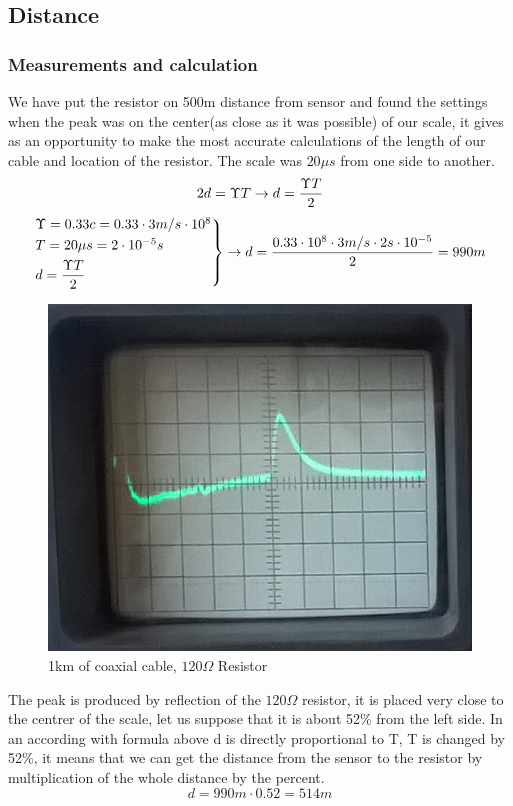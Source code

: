 \documentclass[english]{article}
\begin{document}
\subsection{Distance}
\subsubsection{Measurements and calculation}
We have put the resistor on 500m distance from sensor and found the settings when the peak was on the center(as close as it was possible) of our scale, it gives as an opportunity to make the most accurate calculations of the length of our cable and location of the resistor. The scale was $20\mu s$ from one side to another.
$$
2d= \Upsilon T \rightarrow d=\dfrac{\Upsilon T}{2}\\
$$
$$
\begin{rcases}
\Upsilon=0.33c=0.33 \cdot 3m/s \cdot 10^8 \\
T=20 \mu s=2 \cdot10^{-5}s\\
d=\dfrac{\Upsilon T}{2}
\end{rcases}  \rightarrow d=\frac{0.33 \cdot 10^8 \cdot 3m/s \cdot 2s \cdot 10^{-5}}{2}=990m
$$
\begin{figure}[H]
\centerline{\includegraphics[scale=0.5]{Radar/6}}
\caption{1km of coaxial cable, $120 \Omega$ Resistor}
\end{figure}
The peak is produced by reflection of the $120 \Omega$ resistor, it is placed very close to the centrer of the scale, let us suppose that it is about 52\% from the left side. In an according with formula above d is directly proportional to T, T is changed by 52\%, it means that we can get the distance from the sensor to the resistor by multiplication of the whole distance by the percent.
$$
d=990m\cdot0.52=514m
$$
\end{document}
